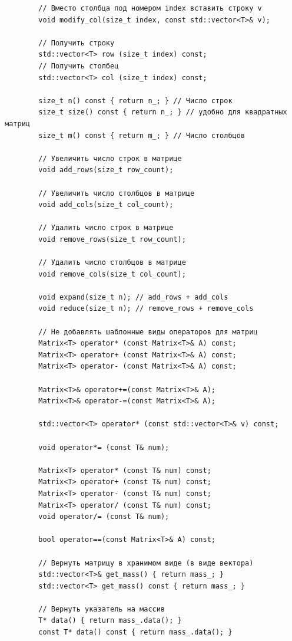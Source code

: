 \documentclass[12pt,fleqn]{article}
\begin{document}
\begin{mdframed}[linecolor=black, topline=true, bottomline=true,
                leftline=false, rightline=false]
\begin{verbatim}
        // Вместо столбца под номером index вставить строку v
        void modify_col(size_t index, const std::vector<T>& v);

        // Получить строку
        std::vector<T> row (size_t index) const;
        // Получить столбец
        std::vector<T> col (size_t index) const;

        size_t n() const { return n_; } // Число строк
        size_t size() const { return n_; } // удобно для квадратных матриц
        size_t m() const { return m_; } // Число столбцов

        // Увеличить число строк в матрице
        void add_rows(size_t row_count);

        // Увеличить число столбцов в матрице
        void add_cols(size_t col_count);

        // Удалить число строк в матрице
        void remove_rows(size_t row_count);

        // Удалить число столбцов в матрице
        void remove_cols(size_t col_count);

        void expand(size_t n); // add_rows + add_cols
        void reduce(size_t n); // remove_rows + remove_cols

        // Не добавлять шаблонные виды операторов для матриц
        Matrix<T> operator* (const Matrix<T>& A) const;
        Matrix<T> operator+ (const Matrix<T>& A) const;
        Matrix<T> operator- (const Matrix<T>& A) const;

        Matrix<T>& operator+=(const Matrix<T>& A);
        Matrix<T>& operator-=(const Matrix<T>& A);

        std::vector<T> operator* (const std::vector<T>& v) const;

        void operator*= (const T& num);

        Matrix<T> operator* (const T& num) const;
        Matrix<T> operator+ (const T& num) const;
        Matrix<T> operator- (const T& num) const;
        Matrix<T> operator/ (const T& num) const;
        void operator/= (const T& num);

        bool operator==(const Matrix<T>& A) const;

        // Вернуть матрицу в хранимом виде (в виде вектора)
        std::vector<T>& get_mass() { return mass_; }
        std::vector<T> get_mass() const { return mass_; }

        // Вернуть указатель на массив
        T* data() { return mass_.data(); }
        const T* data() const { return mass_.data(); }


\end{verbatim}
\end{mdframed}
\end{document}

